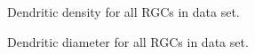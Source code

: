 \documentclass{article}
\begin{document}
\clearpage

\begin{figure}
  \centering
  \caption{Dendritic density for all RGCs in data set.}
\end{figure}

\clearpage

\begin{figure}
  \centering
  \caption{Dendritic diameter for all RGCs in data set.}
\end{figure}

\clearpage
\end{document}
